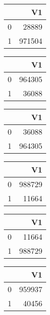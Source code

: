 \bigskip\bigskip
\centering
\begin{tabular}{rr}
  \hline
 & V1 \\ 
  \hline
0 & 28889 \\ 
  1 & 971504 \\ 
   \hline
\end{tabular}

\bigskip\bigskip
\centering
\begin{tabular}{rr}
  \hline
 & V1 \\ 
  \hline
0 & 964305 \\ 
  1 & 36088 \\ 
   \hline
\end{tabular}

\bigskip\bigskip
\centering
\begin{tabular}{rr}
  \hline
 & V1 \\ 
  \hline
0 & 36088 \\ 
  1 & 964305 \\ 
   \hline
\end{tabular}

\bigskip\bigskip
\centering
\begin{tabular}{rr}
  \hline
 & V1 \\ 
  \hline
0 & 988729 \\ 
  1 & 11664 \\ 
   \hline
\end{tabular}

\bigskip\bigskip
\centering
\begin{tabular}{rr}
  \hline
 & V1 \\ 
  \hline
0 & 11664 \\ 
  1 & 988729 \\ 
   \hline
\end{tabular}

\bigskip\bigskip
\centering
\begin{tabular}{rr}
  \hline
 & V1 \\ 
  \hline
0 & 959937 \\ 
  1 & 40456 \\ 
   \hline
\end{tabular}

